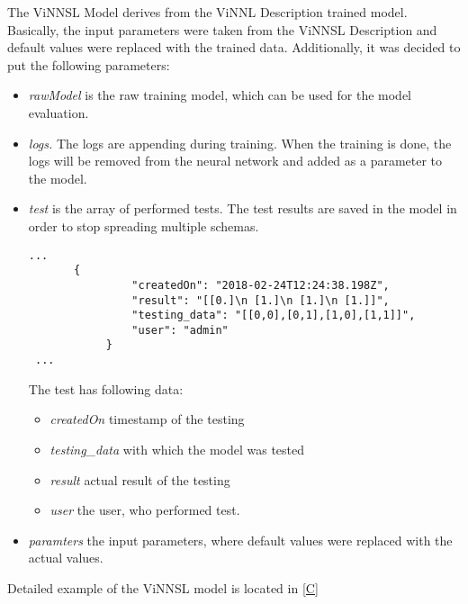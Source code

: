 The ViNNSL Model derives from the ViNNL Description trained model. Basically, the input parameters were taken from the ViNNSL Description and default values were replaced with the trained data. Additionally, it was decided to put the following parameters:

\begin{itemize}
\item \emph{rawModel} is the raw training model, which can be used for the model evaluation. 
\item \emph{logs.} The logs are appending during training. When the training is done, the logs will be removed from the neural network and added as a parameter to the model.
\item \emph{test} is the array of performed tests. The test results are saved in the model in order to stop spreading multiple schemas. 
 \begin{lstlisting}[caption=ViNNSL trained model testing]
...
       {
                "createdOn": "2018-02-24T12:24:38.198Z",
                "result": "[[0.]\n [1.]\n [1.]\n [1.]]",
                "testing_data": "[[0,0],[0,1],[1,0],[1,1]]",
                "user": "admin"
            }
 ...
\end{lstlisting}
The test has following data:
\begin{itemize}
\item \emph{createdOn} timestamp of the testing
\item \emph{testing\_data} with which the model was tested
\item \emph{result} actual result of the testing
\item \emph{user} the user, who performed test.
\end{itemize}
\item \emph{paramters} the input parameters, where default values were replaced with the actual values. 
\end{itemize}

Detailed example of the ViNNSL model is located in \autoref{C}
